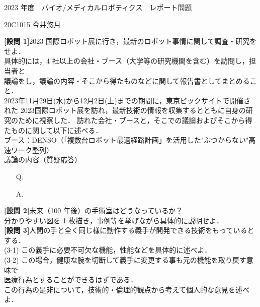 \documentclass{jsarticle}
\begin{document}
\vspace*{-30mm}
{\LARGE 2023 年度　バイオ/メディカルロボティクス　レポート問題}
\begin{flushright}
\large 20C1015 今井悠月
\end{flushright}
\vspace*{10mm}

\textbf{{[設問 1]}}\hspace*{1zw}2023 国際ロボット展に行き，最新のロボット事情に関して調査・研究をせよ．\\
\hspace*{5.7zw}具体的には，4 社以上の会社・ブース（大学等の研究機関を含む）を訪問し，担当者と\\
\hspace*{5.7zw}議論をし，議論の内容・そこから得たものなどに関して報告書としてまとめること．\\

\hspace*{5.7zw}2023年11月29日(水)から12月2日(土)までの期間に，東京ビックサイトで開催された
\hspace*{5.7zw}2023国際ロボット展を訪れ，最新技術の情報を収集するとともに自身の研究のために視察した．
\hspace*{5.7zw}訪れた会社・ブースと，そこでの議論およびそこから得たものに関して以下に述べる．\\


\hspace*{4.7zw}ブース：DENSO（「複数台ロボット最適経路計画」を活用した"ぶつからない"高速ワーク整列）\\
\hspace*{5.7zw}議論の内容（質疑応答）

\begin{itemize}
  \addtolength{\itemindent}{5.4zw}
  \item [Q.]
  \item [A.]
\end{itemize}






\textbf{{[設問 2]}}\hspace*{1zw}未来（100 年後）の手術室はどうなっているか？\\
\hspace*{5.7zw}分かりやすい図を 1 枚描き，事例等を挙げながら具体的に説明せよ．\\


\textbf{{[設問 3]}}\hspace*{1zw}人間の手と全く同じ様に動作する義手が開発できる技術をもっているとする．\\
\hspace*{5.7zw}(3-1) この義手に必要不可欠な機能，性能などを具体的に述べよ．\\

\hspace*{4.7zw}(3-2) この場合，健康な腕を切断して義手に変更する事も元の機能を取り戻す意味で\\
\hspace*{8.4zw}医療行為とすることができるはずである．\\
\hspace*{8.4zw}この行為の是非について，技術的・倫理的観点から考えて個人的な意見を述べよ．\\
\end{document}
